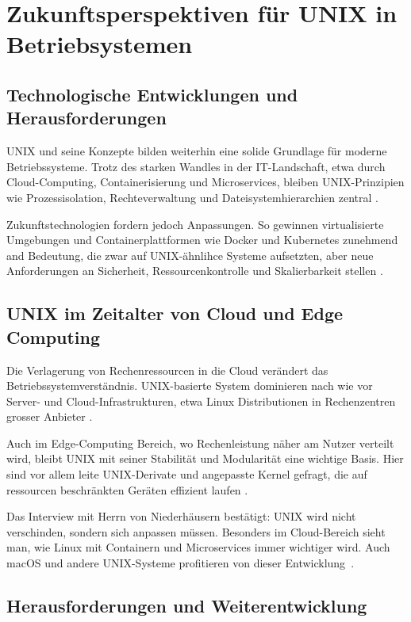 \section{Zukunftsperspektiven für UNIX in Betriebsystemen}

\subsection{Technologische Entwicklungen und Herausforderungen}

UNIX und seine Konzepte bilden weiterhin eine solide Grundlage für moderne Betriebssysteme. Trotz des starken Wandles in der IT-Landschaft, etwa durch
Cloud-Computing, Containerisierung und Microservices, bleiben UNIX-Prinzipien wie Prozessisolation, Rechteverwaltung und Dateisystemhierarchien zentral
\cite{ArtOfUnixProgramming, ModernOS}.

Zukunftstechnologien fordern jedoch Anpassungen. So gewinnen virtualisierte Umgebungen und Containerplattformen wie Docker und Kubernetes zunehmend and Bedeutung,
die zwar auf UNIX-ähnlihce Systeme aufsetzten, aber neue Anforderungen an Sicherheit, Ressourcenkontrolle und Skalierbarkeit stellen \cite{OSConcept}.


\subsection{UNIX im Zeitalter von Cloud und Edge Computing}

Die Verlagerung von Rechenressourcen in die Cloud verändert das Betriebssystemverständnis. UNIX-basierte System dominieren nach wie vor Server- und
Cloud-Infrastrukturen, etwa Linux Distributionen in Rechenzentren grosser Anbieter \cite{ModernOS, OSConcept}.

Auch im Edge-Computing Bereich, wo Rechenleistung näher am Nutzer verteilt wird, bleibt UNIX mit seiner Stabilität und Modularität eine wichtige Basis.
Hier sind vor allem leite UNIX-Derivate und angepasste Kernel gefragt, die auf ressourcen beschränkten Geräten effizient laufen \cite{interviewNH}.

Das Interview mit Herrn von Niederhäusern bestätigt: \glqq UNIX wird nicht verschinden, sondern sich anpassen müssen. Besonders im Cloud-Bereich sieht man, wie
Linux mit Containern und Microservices immer wichtiger wird. Auch macOS und andere UNIX-Systeme profitieren von dieser Entwicklung\grqq \ \cite{interviewNH}.


\subsection{Herausforderungen und Weiterentwicklung}

